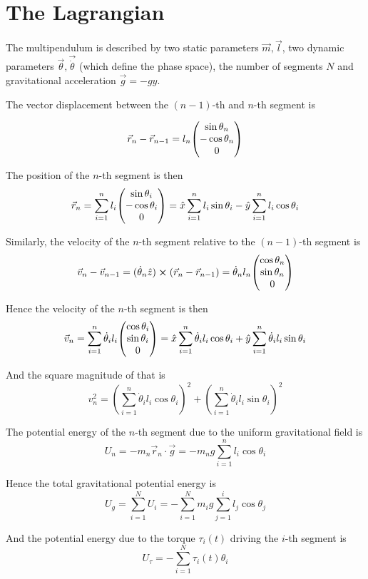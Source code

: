 \documentclass[12pt]{article}
\begin{document}
	\section{The Lagrangian}

	The multipendulum is described by two static parameters $\vec{m}, \vec{l}$, two dynamic parameters $\vec{\theta},\vec{\dot{\theta}}$ (which define the phase space), the number of segments $N$ and gravitational acceleration $\vec{g}=-g\hat{y}$.
	
	The vector displacement between the $(n-1)$-th and $n$-th segment is
	
	$$\vec{r}_n-\vec{r}_{n-1}=l_n\mqty(\sin{\theta_n} \\ -\cos{\theta_n} \\ 0)$$
	
	The position of the $n$-th segment is then
	$$\vec{r}_n=\sum_{i=1}^n l_i\mqty(\sin{\theta_i} \\ -\cos{\theta_i} \\ 0)=\hat{x}\sum_{i=1}^n l_i \sin{\theta_i}-\hat{y}\sum_{i=1}^n l_i \cos{\theta_i}$$
	
	Similarly, the velocity of the $n$-th segment relative to the $(n-1)$-th segment is
	$$\vec{v}_n-\vec{v}_{n-1}=(\dot{\theta}_n\hat{z})\cross (\vec{r}_n-\vec{r}_{n-1})=\dot{\theta}_n l_n \mqty(\cos{\theta_n} \\ \sin{\theta_n} \\ 0)$$
	
	Hence the velocity of the $n$-th segment is then
	$$\vec{v}_n=\sum_{i=1}^n \dot{\theta}_i l_i \mqty(\cos{\theta_i} \\ \sin{\theta_i} \\ 0) = \hat{x}\sum_{i=1}^n \dot{\theta}_i l_i \cos{\theta_i}+\hat{y}\sum_{i=1}^n \dot{\theta}_i l_i \sin{\theta_i}$$
	
	And the square magnitude of that is
	$$v_n^2=\left(\sum_{i=1}^n \dot{\theta}_i l_i \cos{\theta_i}\right)^2+\left(\sum_{i=1}^n \dot{\theta}_i l_i \sin{\theta_i}\right)^2$$
	
	The potential energy of the $n$-th segment due to the uniform gravitational field is
	$$U_n=-m_n\vec{r}_n\cdot\vec{g}=-m_ng\sum_{i=1}^n l_i \cos{\theta_i}$$
	
	Hence the total gravitational potential energy is
	$$U_g=\sum_{i=1}^N U_i=-\sum_{i=1}^N m_ig\sum_{j=1}^i l_j \cos{\theta_j}$$
	
	And the potential energy due to the torque $\tau_i(t)$ driving the $i$-th segment is
	$$U_\tau = -\sum_{i=1}^N\tau_i(t)\theta_i$$
	
\end{document}
